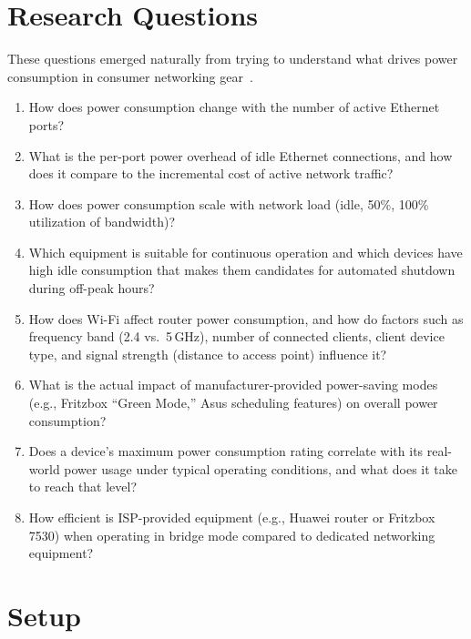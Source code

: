 \documentclass[a4paper,oneside,10pt,ngerman,english]{scrartcl}
\begin{document}
\section{Research Questions}
\label{sec:research-questions}
These questions emerged naturally from trying to understand what drives power consumption in consumer networking gear~\cite{bib:andrade2013,bib:lanzisera2012}.
\begin{enumerate}
    \item[\textbf{RQ1}] How does power consumption change with the number of active Ethernet ports?
    \label{rq:ports}
    \item[\textbf{RQ2}] What is the per-port power overhead of idle Ethernet connections, and how does it compare to the incremental cost of active network traffic?
    \label{rq:port-overhead}
    \item[\textbf{RQ3}] How does power consumption scale with network load (idle, 50\%, 100\% utilization of bandwidth)?
    \label{rq:load-scaling}
    \item[\textbf{RQ4}] Which equipment is suitable for continuous operation and which devices have high idle consumption that makes them candidates for automated shutdown during off-peak hours?
    \label{rq:idle-suitability}
    \item[\textbf{RQ5}] How does Wi-Fi affect router power consumption, and how do factors such as frequency band (2.4 vs.\ 5\,GHz), number of connected clients, client device type, and signal strength (distance to access point) influence it?
    \label{rq:wifi-impact}
    \item[\textbf{RQ6}] What is the actual impact of manufacturer-provided power-saving modes (e.g., Fritzbox ``Green Mode,'' Asus scheduling features) on overall power consumption?
    \label{rq:power-saving}
    \item[\textbf{RQ7}] Does a device's maximum power consumption rating correlate with its real-world power usage under typical operating conditions, and what does it take to reach that level?
    \label{rq:rated-vs-real}
    \item[\textbf{RQ8}] How efficient is ISP-provided equipment (e.g., Huawei router or Fritzbox 7530) when operating in bridge mode compared to dedicated networking equipment?
    \label{rq:bridge-mode}
\end{enumerate}

\section{Setup}
\label{sec:setup}
\end{document}
